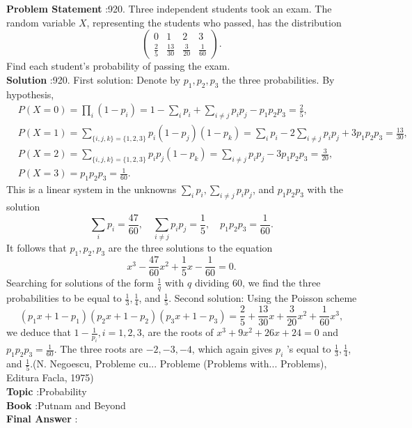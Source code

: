 \documentclass[10pt]{article}
\begin{document}
\textbf{Problem Statement} :920. Three independent students took an exam. The random variable $X$, representing the students who passed, has the distribution$$ \left(\begin{array}{cccc} 0 & 1 & 2 & 3 \\ \frac{2}{5} & \frac{13}{30} & \frac{3}{20} & \frac{1}{60} \end{array}\right) . $$Find each student's probability of passing the exam.\\
\textbf{Solution} :920. First solution: Denote by $p_{1}, p_{2}, p_{3}$ the three probabilities. By hypothesis,$$ \begin{aligned} &P(X=0)=\prod_{i}\left(1-p_{i}\right)=1-\sum_{i} p_{i}+\sum_{i \neq j} p_{i} p_{j}-p_{1} p_{2} p_{3}=\frac{2}{5}, \\ &P(X=1)=\sum_{\{i, j, k\}=\{1,2,3\}} p_{i}\left(1-p_{j}\right)\left(1-p_{k}\right)=\sum_{i} p_{i}-2 \sum_{i \neq j} p_{i} p_{j}+3 p_{1} p_{2} p_{3}=\frac{13}{30}, \\ &P(X=2)=\sum_{\{i, j, k\}=\{1,2,3\}} p_{i} p_{j}\left(1-p_{k}\right)=\sum_{i \neq j} p_{i} p_{j}-3 p_{1} p_{2} p_{3}=\frac{3}{20}, \\ &P(X=3)=p_{1} p_{2} p_{3}=\frac{1}{60} . \end{aligned} $$This is a linear system in the unknowns $\sum_{i} p_{i}, \sum_{i \neq j} p_{i} p_{j}$, and $p_{1} p_{2} p_{3}$ with the solution$$ \sum_{i} p_{i}=\frac{47}{60}, \quad \sum_{i \neq j} p_{i} p_{j}=\frac{1}{5}, \quad p_{1} p_{2} p_{3}=\frac{1}{60} . $$It follows that $p_{1}, p_{2}, p_{3}$ are the three solutions to the equation$$ x^{3}-\frac{47}{60} x^{2}+\frac{1}{5} x-\frac{1}{60}=0 . $$Searching for solutions of the form $\frac{1}{q}$ with $q$ dividing 60, we find the three probabilities to be equal to $\frac{1}{3}, \frac{1}{4}$, and $\frac{1}{5}$. Second solution: Using the Poisson scheme$$ \left(p_{1} x+1-p_{1}\right)\left(p_{2} x+1-p_{2}\right)\left(p_{3} x+1-p_{3}\right)=\frac{2}{5}+\frac{13}{30} x+\frac{3}{20} x^{2}+\frac{1}{60} x^{3}, $$we deduce that $1-\frac{1}{p_{i}}, i=1,2,3$, are the roots of $x^{3}+9 x^{2}+26 x+24=0$ and $p_{1} p_{2} p_{3}=\frac{1}{60}$. The three roots are $-2,-3,-4$, which again gives $p_{i}$ 's equal to $\frac{1}{3}, \frac{1}{4}$, and $\frac{1}{5}$.(N. Negoescu, Probleme cu... Probleme (Problems with... Problems), Editura Facla, 1975)\\
\textbf{Topic} :Probability\\
\textbf{Book} :Putnam and Beyond\\
\textbf{Final Answer} :\\
\end{document}
